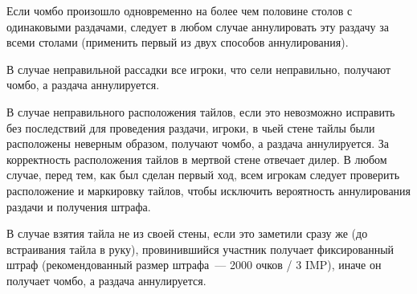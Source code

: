 \begin{additional}
\vspace{0.3cm}

Если чомбо произошло одновременно на более чем половине столов с одинаковыми раздачами, следует в любом случае аннулировать эту раздачу за всеми столами (применить первый из двух способов аннулирования).

\vspace{0.3cm}

В случае неправильной рассадки все игроки, что сели неправильно, получают чомбо, а раздача аннулируется.

\vspace{0.3cm}

В случае неправильного расположения тайлов, если это невозможно исправить без последствий для проведения раздачи, игроки, в чьей стене тайлы были расположены неверным образом, получают чомбо, а раздача аннулируется. За корректность расположения тайлов в мертвой стене отвечает дилер. В любом случае, перед тем, как был сделан первый ход, всем игрокам следует проверить расположение и маркировку тайлов, чтобы исключить вероятность аннулирования раздачи и получения штрафа.

\vspace{0.3cm}

В случае взятия тайла не из своей стены, если это заметили сразу же (до встраивания тайла в руку), провинившийся участник получает фиксированный штраф (рекомендованный размер штрафа~--- 2000 очков / 3 IMP), иначе он получает чомбо, а раздача аннулируется.

\end{additional}
